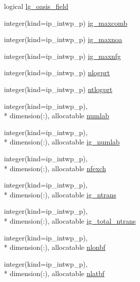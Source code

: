 \begin{DoxyCompactItemize}
\item 
logical \hyperlink{classmod__oasis__namcouple_aaf6b923ffc7763fd37a5c4c72bdfa34d}{lg\+\_\+oasis\+\_\+field}
\item 
integer(kind=ip\+\_\+intwp\+\_\+p) \hyperlink{classmod__oasis__namcouple_abba00866a740567bc1d93cf5850042fd}{ig\+\_\+maxcomb}
\item 
integer(kind=ip\+\_\+intwp\+\_\+p) \hyperlink{classmod__oasis__namcouple_ae66cf9f63b6c440406c9b675caef7759}{ig\+\_\+maxnoa}
\item 
integer(kind=ip\+\_\+intwp\+\_\+p) \hyperlink{classmod__oasis__namcouple_aab2d4bcc2dc767df51f99f907f4f3e6e}{ig\+\_\+maxnfg}
\item 
integer(kind=ip\+\_\+intwp\+\_\+p) \hyperlink{classmod__oasis__namcouple_a7b8c924fdea622759b99d8f61e03ade5}{nlogprt}
\item 
integer(kind=ip\+\_\+intwp\+\_\+p) \hyperlink{classmod__oasis__namcouple_a49bd874b06648257f7ce70da19a678b4}{ntlogprt}
\item 
integer(kind=ip\+\_\+intwp\+\_\+p), \\*
dimension(\+:), allocatable \hyperlink{classmod__oasis__namcouple_a12e1621f5697a0cdbde11d3e25f43b54}{numlab}
\item 
integer(kind=ip\+\_\+intwp\+\_\+p), \\*
dimension(\+:), allocatable \hyperlink{classmod__oasis__namcouple_ab0b9a7822ec44010e8652ed2d6abc0db}{ig\+\_\+numlab}
\item 
integer(kind=ip\+\_\+intwp\+\_\+p), \\*
dimension(\+:), allocatable \hyperlink{classmod__oasis__namcouple_ac6216c78a2779e49f90a9a95a39c27d7}{nfexch}
\item 
integer(kind=ip\+\_\+intwp\+\_\+p), \\*
dimension(\+:), allocatable \hyperlink{classmod__oasis__namcouple_ac4549f9f5bbb37fce3edc9a208e0d48b}{ig\+\_\+ntrans}
\item 
integer(kind=ip\+\_\+intwp\+\_\+p), \\*
dimension(\+:), allocatable \hyperlink{classmod__oasis__namcouple_abbd7bd184bb2a3860063dbb9f109f427}{ig\+\_\+total\+\_\+ntrans}
\item 
integer(kind=ip\+\_\+intwp\+\_\+p), \\*
dimension(\+:), allocatable \hyperlink{classmod__oasis__namcouple_a6e774d31f16b513b1d604e72a82dff40}{nlonbf}
\item 
integer(kind=ip\+\_\+intwp\+\_\+p), \\*
dimension(\+:), allocatable \hyperlink{classmod__oasis__namcouple_a9b09ac96dad78313003a9436fe2f9aec}{nlatbf}

\end{DoxyCompactItemize}
